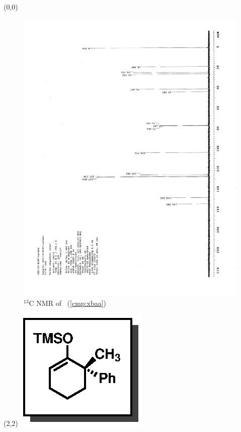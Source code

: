 \clearpage
\begin{textblock}{20}(0,0)
\begin{figure}[htb]
\caption{$^{13}$C NMR of  \CMPxbaa\ (\ref{cmp:xbaa})}
\includegraphics[scale=0.75, trim = 0mm 0mm 0mm 5mm,
clip]{chp_singlecarbon/images/nmr/xbaaC}
\vspace{-100pt}
\end{figure}
\end{textblock}
\begin{textblock}{1}(2,2)
\includegraphics[scale=0.8, angle=90]{chp_singlecarbon/images/xbaa}
\end{textblock}
\clearpage

